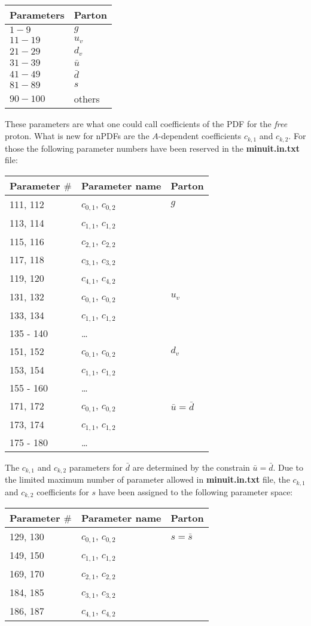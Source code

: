 \documentclass{article}
\begin{document}
\begin{tabular}[h!]{ll}
Parameters & Parton \\ \hline
$1-9$ & $g$ \\
$11-19$ & $u_v$\\
$21-29$ & $d_v$\\
$31-39$ & $\bar{u}$\\
$41-49$ & $\bar{d}$\\
$81-89$ &$s$\\
$90-100$ & others
\end{tabular}
\vskip 0.2in

\noindent These parameters are what one could call coefficients of the PDF for the \textit{free} proton.
What is new for nPDFs are the $A$-dependent coefficients $c_{k,1}$ and $c_{k,2}$. For those the following parameter numbers have been reserved in the \textbf{minuit.in.txt} file:\\

\begin{tabular}[h!]{lll}
Parameter $\#$ & Parameter name & Parton \\ \hline
111, 112 & $c_{0,1}$, $c_{0,2}$ & $g$ \\
113, 114 & $c_{1,1}$, $c_{1,2}$ &  \\
115, 116 & $c_{2,1}$, $c_{2,2}$ &  \\
117, 118 & $c_{3,1}$, $c_{3,2}$ &  \\
119, 120 & $c_{4,1}$, $c_{4,2}$ &  \\ \hline
131, 132 & $c_{0,1}$, $c_{0,2}$ & $u_v$ \\
133, 134 & $c_{1,1}$, $c_{1,2}$ &  \\
135 - 140 & \dots &  \\\hline
151, 152 & $c_{0,1}$, $c_{0,2}$ & $d_v$ \\
153, 154 & $c_{1,1}$, $c_{1,2}$ &  \\
155 - 160 & \dots &  \\
171, 172 & $c_{0,1}$, $c_{0,2}$ & $\bar{u}=\bar{d}$ \\
173, 174 & $c_{1,1}$, $c_{1,2}$ &  \\
175 - 180 & \dots &  \\\hline
\end{tabular}
\vskip 0.2in
\noindent The $c_{k,1}$ and $c_{k,2}$ parameters for $\bar{d}$ are determined by the constrain $\bar{u}=\bar{d}$. Due to the limited maximum number of parameter allowed in \textbf{minuit.in.txt} file, the $c_{k,1}$ and $c_{k,2}$ coefficients for $s$ have been assigned to the following parameter space:
\vskip 0.2in
\begin{tabular}[h!]{lll}
Parameter $\#$ & Parameter name & Parton \\ \hline
129, 130 & $c_{0,1}$, $c_{0,2}$ & $s=\bar{s}$ \\
149, 150 & $c_{1,1}$, $c_{1,2}$ &  \\
169, 170 & $c_{2,1}$, $c_{2,2}$ &  \\
184, 185 & $c_{3,1}$, $c_{3,2}$ &  \\
186, 187 & $c_{4,1}$, $c_{4,2}$ &  \\ 
\end{tabular}
\vskip 0.2in
\end{document}

